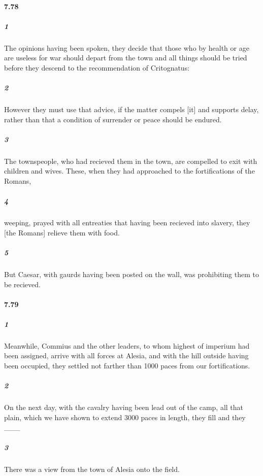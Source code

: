 \documentclass[12pt]{article}
\begin{document}
	\paragraph{7.78}
		\subparagraph{1}
			The opinions having been spoken, they decide that those
			who by health or age are useless for war should depart
			from the town and all things should be tried before they
			descend to the recommendation of Critognatus:
		\subparagraph{2}
			However they must use that advice, if the matter compels
			[it] and supports delay, rather than that a condition of
			surrender or peace should be endured.
		\subparagraph{3}
			The townspeople, who had recieved them in the town, are compelled to exit with children and wives. These, when they had approached to the fortifications of the Romans,
		\subparagraph{4}
			weeping, prayed with all entreaties that having been
			recieved into slavery, they [the Romans] relieve them
			with food.
		\subparagraph{5}
			But Caesar, with gaurds having been posted on the wall, was prohibiting them to be recieved.

	\paragraph{7.79}
		\subparagraph{1}
			Meanwhile, Commius and the other leaders, to whom
			highest of imperium had been assigned, arrive with all forces
			at Alesia, and with the hill outside having been occupied, they settled not farther than 1000 paces from our fortifications.
		\subparagraph{2}
			On the next day, with the cavalry having been lead out of the camp, all that plain, which we have shown to extend 3000 paces in length, they fill and they ___
		\subparagraph{3}
			There was a view from the town of Alesia onto the field.
\end{document}
